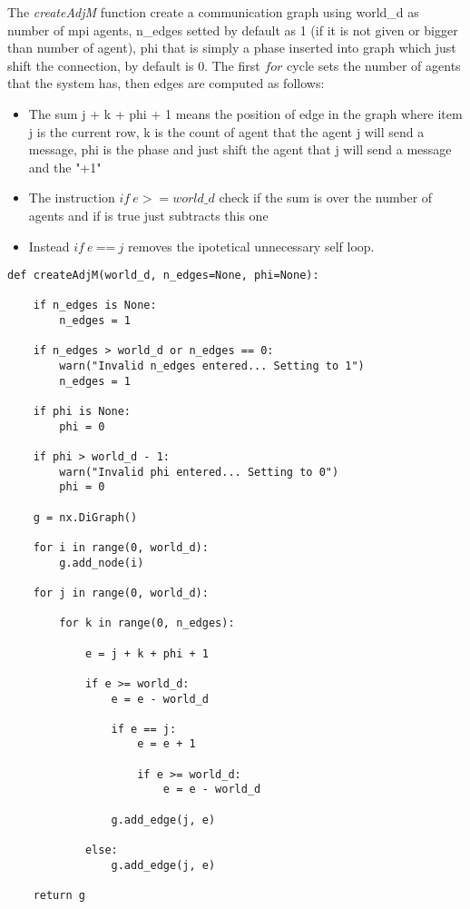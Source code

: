 \documentclass[a4paper,11pt,oneside]{book}
\begin{document}
The \textit{createAdjM} function create a communication graph using world\_d as number of
mpi agents, n\_edges  setted by default as 1 (if it is not given or
bigger than number of agent), phi that is simply a phase inserted into
graph which just shift the connection, by default is 0. The first $for$
cycle sets the number of agents that the system has, then edges are
computed as follows:
\begin{itemize}
    \item The sum j + k + phi + 1 means the position of edge in the
    graph where item j is the current row, k is the count of agent 
    that the agent j will send a message, phi is the phase and just
    shift the agent that j will send a message and the "+1" 

    \item The instruction $ if \ e >= world\_d $  check if the sum is over the number of
    agents and if is true just subtracts this one

    \item Instead $ if \ e \ $==$ \  j $ removes the ipotetical unnecessary self loop.
\end{itemize}

\begin{lstlisting}
def createAdjM(world_d, n_edges=None, phi=None):

    if n_edges is None:
        n_edges = 1

    if n_edges > world_d or n_edges == 0:
        warn("Invalid n_edges entered... Setting to 1")
        n_edges = 1

    if phi is None:
        phi = 0

    if phi > world_d - 1:
        warn("Invalid phi entered... Setting to 0")
        phi = 0

    g = nx.DiGraph()

    for i in range(0, world_d):
        g.add_node(i)

    for j in range(0, world_d):

        for k in range(0, n_edges):

            e = j + k + phi + 1

            if e >= world_d:
                e = e - world_d

                if e == j:
                    e = e + 1

                    if e >= world_d:
                        e = e - world_d

                g.add_edge(j, e)

            else:
                g.add_edge(j, e)

    return g
\end{lstlisting}
\end{document}

